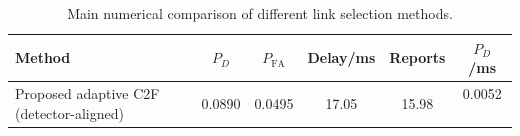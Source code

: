 \begin{table}[t]
    \centering
    \caption{Main numerical comparison of different link selection methods.}
    \label{tab:main_summary}
    \begin{tabular}{l c c c c c}
        \hline
        Method & $P_D$ & $P_{\mathrm{FA}}$ & Delay/ms & Reports & $P_D$/ms \\
        \hline
        Proposed adaptive C2F (detector-aligned) & 0.0890 & 0.0495 & 17.05 & 15.98 & 0.0052 \
        \hline
    \end{tabular}
\end{table}
